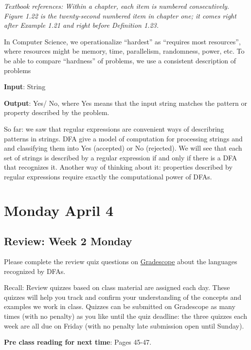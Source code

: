 

{\it Textbook references: Within a chapter, each item is numbered consecutively. Figure 1.22
is the twenty-second numbered item in chapter one; it comes right after Example 1.21 and right before Definition 1.23.}

In Computer Science, we operationalize ``hardest'' as ``requires most resources'', where
resources might be memory, time, parallelism, randomness, power, etc.
To be able to compare ``hardness'' of problems, we use a consistent description of problems

{\bf Input}: String

{\bf Output}: Yes/ No, where Yes means that the input string matches the pattern or property described by the problem.

So far: we saw that regular expressions are convenient ways of describring patterns in strings.
DFA give a model of computation for processing strings and and classifying them into Yes (accepted)
or No (rejected). We will see that each set of strings is described by a regular expression if and only 
if there is a DFA that recognizes it.  Another way of thinking about it: properties described by regular
expressions require exactly the computational power of DFAs.


\section*{Monday April 4}


    
\newpage
\subsection*{Review: Week 2 Monday}

Please complete the review quiz questions on \href{http://gradescope.com}{Gradescope} about 
the languages recognized by DFAs.


Recall: Review quizzes based on class material are assigned each day. 
These quizzes will help you track and confirm your understanding of the concepts and examples 
we work in class. Quizzes can be submitted on Gradescope as many times (with no penalty) as 
you like until the quiz deadline: the three quizzes each week are all due on Friday (with no penalty 
late submission open until Sunday).

{\bf Pre class reading for next time}: Pages 45-47.


